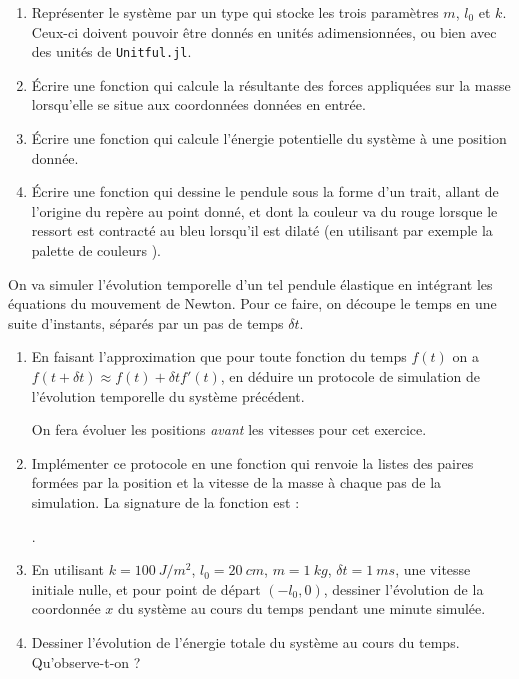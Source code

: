 \documentclass{article}
\begin{document}
\begin{enumerate}
	\item Représenter le système par un type  qui stocke les trois paramètres $m$, $l_0$ et $k$. Ceux-ci doivent pouvoir être donnés en unités adimensionnées, ou bien avec des unités de \texttt{Unitful.jl}.
	\item Écrire une fonction  qui calcule la résultante des forces appliquées sur la masse lorsqu'elle se situe aux coordonnées données en entrée.
	\item Écrire une fonction  qui calcule l'énergie potentielle du système à une position donnée.
	\item Écrire une fonction  qui dessine le pendule sous la forme d'un trait, allant de l'origine du repère au point donné, et dont la couleur va du rouge lorsque le ressort est contracté au bleu lorsqu'il est dilaté (en utilisant par exemple la palette de couleurs ).
\end{enumerate}

On va simuler l'évolution temporelle d'un tel pendule élastique en intégrant les équations du mouvement de Newton. Pour ce faire, on découpe le temps en une suite d'instants, séparés par un pas de temps $\delta t$.

\begin{enumerate}[resume]
	\item En faisant l'approximation que pour toute fonction du temps $f(t)$ on a $f(t+\delta t) \approx f(t) + \delta tf'(t)$, en déduire un protocole de simulation de l'évolution temporelle du système précédent.

	On fera évoluer les positions \textsl{avant} les vitesses pour cet exercice.
	\item Implémenter ce protocole en une fonction qui renvoie la listes des paires formées par la position et la vitesse de la masse à chaque pas de la simulation. La signature de la fonction est :
	
	.
	\item En utilisant $k = \qty{100}{J/m^2}$, $l_0 = \qty{20}{cm}$, $m = \qty{1}{kg}$, $\delta t = \qty{1}{ms}$, une vitesse initiale nulle, et pour point de départ $(-l_0, 0)$, dessiner l'évolution de la coordonnée $x$ du système au cours du temps pendant une minute simulée.
	\item Dessiner l'évolution de l'énergie totale du système au cours du temps. Qu'observe-t-on ?
\end{enumerate}
\end{document}

